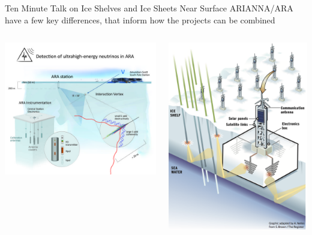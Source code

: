\documentclass{beamer}
\begin{document}
\begin{frame}{Ten Minute Talk on Ice Shelves and Ice Sheets Near Surface}
ARIANNA/ARA have a few key differences, that inform how the projects can be combined
\begin{columns}[T]
\begin{column}{0.6\textwidth}
\centering
\includegraphics[width=\textwidth]{ara_overview.png}
\end{column}
\begin{column}{0.4\textwidth}
\centering
\includegraphics[width=\textwidth]{arianna_overview.png}

\end{column}
\end{columns}
\end{frame}
\end{document}
